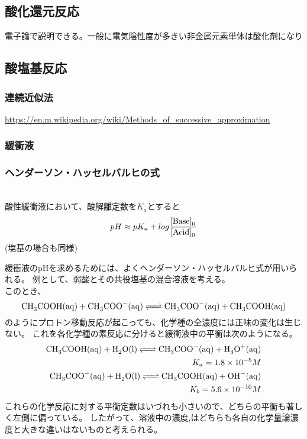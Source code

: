 \documentclass[dvipdfmx,uplatex]{jsarticle}
\begin{document}
\subsection{酸化還元反応}
電子論で説明できる。一般に電気陰性度が多きい非金属元素単体は酸化剤になり

\subsection{酸塩基反応}
\subsubsection{連続近似法}
\url{https://en.m.wikipedia.org/wiki/Methods_of_successive_approximation}

\subsubsection{緩衝液}
\subsubsection{ヘンダーソン・ハッセルバルヒの式}
\begin{theo} \mbox{} \\
酸性緩衝液において、酸解離定数を$K_a$とすると \\
\[
pH \approx pK_a + log \frac{\ce{[Base]0}}{\ce{[Acid]0}}
\]
(塩基の場合も同様)
\end{theo}

緩衝液のpHを求めるためには、よくヘンダーソン・ハッセルバルヒ式が用いられる。
例として、弱酸とその共役塩基の混合溶液を考える。 \\
このとき、
\[
\ce{CH3COOH(aq) + CH3COO- (aq) <=> CH3COO- (aq) + CH3COOH(aq)}
\]
のようにプロトン移動反応が起こっても、化学種の全濃度には正味の変化は生じない。
これを各化学種の素反応に分けると緩衝液中の平衡は次のようになる。
\begin{align*}
\ce{CH3COOH(aq) + H2O(l) <=> CH3COO- (aq) + H3O+(aq)} \\
K_a = 1.8 \times 10^{-5} M \\
\ce{CH3COO- (aq) + H2O(l) <=> CH3COOH(aq) + OH- (aq)} \\
K_b = 5.6 \times 10^{-10} M
\end{align*}
これらの化学反応に対する平衡定数はいづれも小さいので、どちらの平衡も著しく左側に偏っている。
したがって、溶液中の濃度\ce{[CH3COOH]},\ce{[CH3COO- ]}はどちらも各自の化学量論濃度と大きな違いはないものと考えられる。
\end{document}
